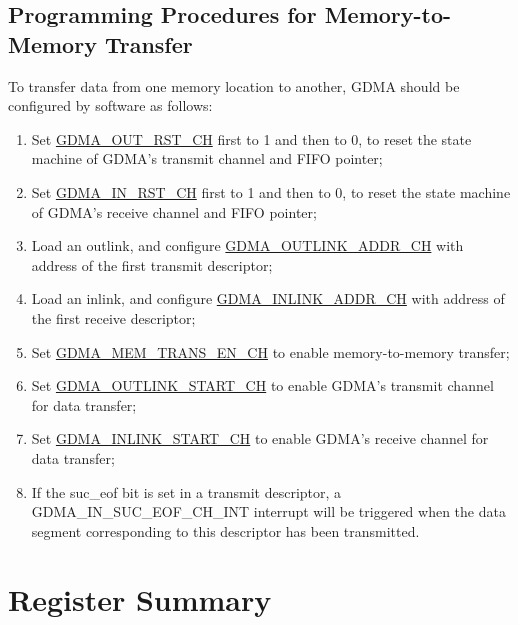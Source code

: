\documentclass[main\_\_EN.tex]{subfiles}
\begin{document}
\subsection{Programming Procedures for Memory-to-Memory Transfer}
To transfer data from one memory location to another, GDMA should be configured by software as follows:
\begin{enumerate}
    \item Set \hyperref[fielddesc:DMAOUTRSTCHN]{GDMA\_OUT\_RST\_CH} first to 1 and then to 0, to reset the state machine of GDMA's transmit channel and FIFO pointer;
    \item Set \hyperref[fielddesc:DMAINRSTCHN]{GDMA\_IN\_RST\_CH} first to 1 and then to 0, to reset the state machine of GDMA's receive channel and FIFO pointer;
    \item Load an outlink, and configure \hyperref[fielddesc:DMAOUTLINKADDRCHN]{GDMA\_OUTLINK\_ADDR\_CH}  with address of the first transmit descriptor;
    \item Load an inlink, and configure \hyperref[fielddesc:DMAINLINKADDRCHN]{GDMA\_INLINK\_ADDR\_CH} with address of the first receive descriptor;
    \item Set \hyperref[fielddesc:DMAMEMTRANSENCHN]{GDMA\_MEM\_TRANS\_EN\_CH} to enable memory-to-memory transfer;
    \item Set \hyperref[fielddesc:DMAOUTLINKSTARTCHN]{GDMA\_OUTLINK\_START\_CH} to enable GDMA's transmit channel for data transfer;
    \item Set \hyperref[fielddesc:DMAINLINKSTARTCHN]{GDMA\_INLINK\_START\_CH} to enable GDMA's receive channel for data transfer;
    \item If the suc\_eof bit is set in a transmit descriptor, a GDMA\_IN\_SUC\_EOF\_CH\_INT interrupt will be triggered when the data segment corresponding to this descriptor has been transmitted.
\end{enumerate}





\clearpage
\hypertarget{dma-reg-summ}{}
\section{Register Summary}
\label{sec:dma-reg-summ}
\end{document}
